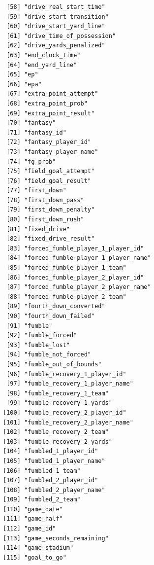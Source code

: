 \documentclass[
  letterpaper,
]{krantz}
\begin{document}
\begin{verbatim}
 [58] "drive_real_start_time"               
 [59] "drive_start_transition"              
 [60] "drive_start_yard_line"               
 [61] "drive_time_of_possession"            
 [62] "drive_yards_penalized"               
 [63] "end_clock_time"                      
 [64] "end_yard_line"                       
 [65] "ep"                                  
 [66] "epa"                                 
 [67] "extra_point_attempt"                 
 [68] "extra_point_prob"                    
 [69] "extra_point_result"                  
 [70] "fantasy"                             
 [71] "fantasy_id"                          
 [72] "fantasy_player_id"                   
 [73] "fantasy_player_name"                 
 [74] "fg_prob"                             
 [75] "field_goal_attempt"                  
 [76] "field_goal_result"                   
 [77] "first_down"                          
 [78] "first_down_pass"                     
 [79] "first_down_penalty"                  
 [80] "first_down_rush"                     
 [81] "fixed_drive"                         
 [82] "fixed_drive_result"                  
 [83] "forced_fumble_player_1_player_id"    
 [84] "forced_fumble_player_1_player_name"  
 [85] "forced_fumble_player_1_team"         
 [86] "forced_fumble_player_2_player_id"    
 [87] "forced_fumble_player_2_player_name"  
 [88] "forced_fumble_player_2_team"         
 [89] "fourth_down_converted"               
 [90] "fourth_down_failed"                  
 [91] "fumble"                              
 [92] "fumble_forced"                       
 [93] "fumble_lost"                         
 [94] "fumble_not_forced"                   
 [95] "fumble_out_of_bounds"                
 [96] "fumble_recovery_1_player_id"         
 [97] "fumble_recovery_1_player_name"       
 [98] "fumble_recovery_1_team"              
 [99] "fumble_recovery_1_yards"             
[100] "fumble_recovery_2_player_id"         
[101] "fumble_recovery_2_player_name"       
[102] "fumble_recovery_2_team"              
[103] "fumble_recovery_2_yards"             
[104] "fumbled_1_player_id"                 
[105] "fumbled_1_player_name"               
[106] "fumbled_1_team"                      
[107] "fumbled_2_player_id"                 
[108] "fumbled_2_player_name"               
[109] "fumbled_2_team"                      
[110] "game_date"                           
[111] "game_half"                           
[112] "game_id"                             
[113] "game_seconds_remaining"              
[114] "game_stadium"                        
[115] "goal_to_go"                          

\end{verbatim}
\end{document}
